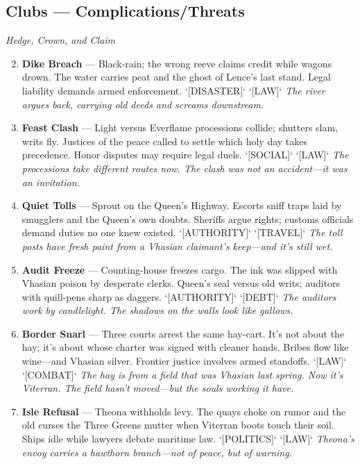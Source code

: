\subsection{Clubs --- Complications/Threats}
\label{sec:viterra-complications}
\noindent\textit{Hedge, Crown, and Claim}

\begin{enumerate}
\setcounter{enumi}{1}
\item \textbf{Dike Breach} --- Black-rain; the wrong reeve claims credit while wagons drown. The water carries peat and the ghost of Lence's last stand. Legal liability demands armed enforcement. `[DISASTER]` `[LAW]`
  \hfill \textit{The river argues back, carrying old deeds and screams downstream.}
\item \textbf{Feast Clash} --- Light versus Everflame processions collide; shutters slam, writs fly. Justices of the peace called to settle which holy day takes precedence. Honor disputes may require legal duels. `[SOCIAL]` `[LAW]`
  \hfill \textit{The processions take different routes now. The clash was not an accident---it was an invitation.}
\item \textbf{Quiet Tolls} --- Sprout on the Queen's Highway. Escorts sniff traps laid by smugglers and the Queen's own doubts. Sheriffs argue rights; customs officials demand duties no one knew existed. `[AUTHORITY]` `[TRAVEL]`
  \hfill \textit{The toll posts have fresh paint from a Vhasian claimant's keep---and it's still wet.}
\item \textbf{Audit Freeze} --- Counting-house freezes cargo. The ink was slipped with Vhasian poison by desperate clerks. Queen's seal versus old writs; auditors with quill-pens sharp as daggers. `[AUTHORITY]` `[DEBT]`
  \hfill \textit{The auditors work by candlelight. The shadows on the walls look like gallows.}
\item \textbf{Border Snarl} --- Three courts arrest the same hay-cart. It's not about the hay; it's about whose charter was signed with cleaner hands. Bribes flow like wine---and Vhasian silver. Frontier justice involves armed standoffs. `[LAW]` `[COMBAT]`
  \hfill \textit{The hay is from a field that was Vhasian last spring. Now it's Viterran. The field hasn't moved---but the souls working it have.}
\item \textbf{Isle Refusal} --- Theona withholds levy. The quays choke on rumor and the old curses the Three Greens mutter when Viterran boots touch their soil. Ships idle while lawyers debate maritime law. `[POLITICS]` `[LAW]`
  \hfill \textit{Theona's envoy carries a hawthorn branch---not of peace, but of warning.}

\end{enumerate}
